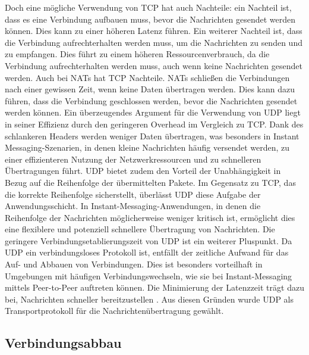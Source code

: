 Doch eine mögliche Verwendung von TCP hat auch Nachteile: ein Nachteil ist, dass es eine Verbindung aufbauen muss, bevor die Nachrichten gesendet werden können. Dies kann zu einer höheren Latenz führen. Ein weiterer Nachteil ist, dass die Verbindung aufrechterhalten werden muss, um die Nachrichten zu senden und zu empfangen. Dies führt zu einem höheren Ressourcenverbrauch, da die Verbindung aufrechterhalten werden muss, auch wenn keine Nachrichten gesendet werden. Auch bei NATs hat TCP Nachteile. NATs schließen die Verbindungen nach einer gewissen Zeit, wenn keine Daten übertragen werden. Dies kann dazu führen, dass die Verbindung geschlossen werden, bevor die Nachrichten gesendet werden können. 
Ein überzeugendes Argument für die Verwendung von UDP liegt in seiner Effizienz durch den geringeren Overhead im Vergleich zu TCP. Dank des schlankeren Headers werden weniger Daten übertragen, was besonders in Instant Messaging-Szenarien, in denen kleine Nachrichten häufig versendet werden, zu einer effizienteren Nutzung der Netzwerkressourcen und zu schnelleren Übertragungen führt. UDP bietet zudem den Vorteil der Unabhängigkeit in Bezug auf die Reihenfolge der übermittelten Pakete. Im Gegensatz zu TCP, das die korrekte Reihenfolge sicherstellt, überlässt UDP diese Aufgabe der Anwendungsschicht. In Instant-Messaging-Anwendungen, in denen die Reihenfolge der Nachrichten möglicherweise weniger kritisch ist, ermöglicht dies eine flexiblere und potenziell schnellere Übertragung von Nachrichten. Die geringere Verbindungsetablierungszeit von UDP ist ein weiterer Pluspunkt. Da UDP ein verbindungsloses Protokoll ist, entfällt der zeitliche Aufwand für das Auf- und Abbauen von Verbindungen. Dies ist besonders vorteilhaft in Umgebungen mit häufigen Verbindungswechseln, wie sie bei Instant-Messaging mittels Peer-to-Peer auftreten können. Die Minimierung der Latenzzeit trägt dazu bei, Nachrichten schneller bereitzustellen \parencites{rfc768_UDP}{rfc9293_TCP}. 
Aus diesen Gründen wurde UDP als Transportprotokoll für die Nachrichtenübertragung gewählt.


\subsection{Verbindungsabbau}

 